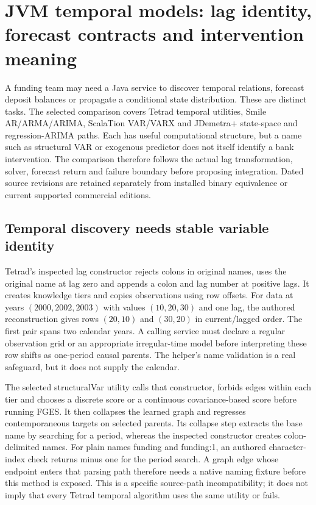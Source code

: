 \section[JVM temporal models and inference]{JVM temporal models: lag identity, forecast contracts and intervention meaning}
\label{sec:exec25-java-dynamic}

A funding team may need a Java service to discover temporal relations, forecast deposit balances or propagate a conditional state distribution. These are distinct tasks. The selected comparison covers Tetrad temporal utilities, Smile AR/ARMA/ARIMA, ScalaTion VAR/VARX and JDemetra+ state-space and regression-ARIMA paths. Each has useful computational structure, but a name such as structural VAR or exogenous predictor does not itself identify a bank intervention. The comparison therefore follows the actual lag transformation, solver, forecast return and failure boundary before proposing integration. Dated source revisions are retained separately from installed binary equivalence or current supported commercial editions.~\citep{exec25_jdyn_tetrad,exec25_jdyn_smile,exec25_jdyn_scalation,exec25_jdyn_jdplus,exec25_jdyn_choice}

\subsection{Temporal discovery needs stable variable identity}

Tetrad's inspected lag constructor rejects colons in original names, uses the original name at lag zero and appends a colon and lag number at positive lags. It creates knowledge tiers and copies observations using row offsets. For data at years $(2000,2002,2003)$ with values $(10,20,30)$ and one lag, the authored reconstruction gives rows $(20,10)$ and $(30,20)$ in current/lagged order. The first pair spans two calendar years. A calling service must declare a regular observation grid or an appropriate irregular-time model before interpreting these row shifts as one-period causal parents. The helper's name validation is a real safeguard, but it does not supply the calendar.~\citep{exec25_jdyn_tetrad,exec25_jdyn_choice}

The selected structuralVar utility calls that constructor, forbids edges within each tier and chooses a discrete score or a continuous covariance-based score before running FGES. It then collapses the learned graph and regresses contemporaneous targets on selected parents. Its collapse step extracts the base name by searching for a period, whereas the inspected constructor creates colon-delimited names. For plain names funding and funding:1, an authored character-index check returns minus one for the period search. A graph edge whose endpoint enters that parsing path therefore needs a native naming fixture before this method is exposed. This is a specific source-path incompatibility; it does not imply that every Tetrad temporal algorithm uses the same utility or fails.~\citep{exec25_jdyn_tetrad,exec25_jdyn_choice}

